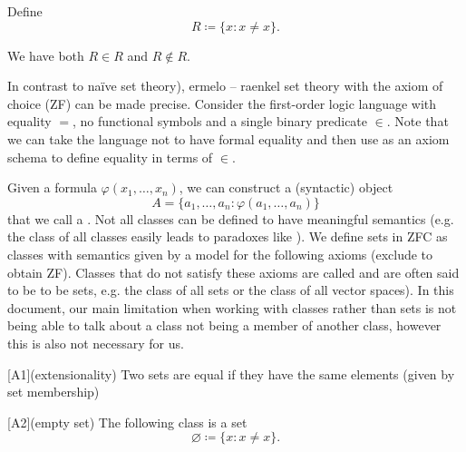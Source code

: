 \begin{example}\label{ex:russels_paradox_sets}
  Define
  \begin{equation*}
    R \coloneqq \{ x \colon x \neq x \}.
  \end{equation*}

  We have both \( R \in R \) and \( R \not\in R \).
\end{example}

\begin{definition}\label{def:set_zfc}\cite[271]{Enderton1977}
  In contrast to na\"ive set theory), ermelo – raenkel set theory with the axiom of choice (ZF) can be made precise. Consider the first-order logic language with equality \( = \), no functional symbols and a single binary predicate \( \in \). Note that we can take the language not to have formal equality and then use  as an axiom schema to define equality in terms of \( \in \).

  Given a formula \( \varphi(x_1, \ldots, x_n) \), we can construct a (syntactic) object
  \begin{equation*}
    A = \{ a_1, \ldots, a_n \colon \varphi(a_1, \ldots, a_n) \}
  \end{equation*}
  that we call a . Not all classes can be defined to have meaningful semantics (e.g. the class of all classes easily leads to paradoxes like ). We define sets in ZFC as classes with semantics given by a model for the following axioms (exclude  to obtain ZF). Classes that do not satisfy these axioms are called  and are often said to be  to be sets, e.g. the class of all sets or the class of all vector spaces). In this document, our main limitation when working with classes rather than sets is not being able to talk about a class not being a member of another class, however this is also not necessary for us.

  \begin{description}
    [A1](extensionality) Two sets are equal if they have the same elements (given by set membership)

    [A2](empty set) The following class is a set
    \begin{equation*}
      \varnothing \coloneqq \{ x \colon x \neq x \}.
    \end{equation*}


\end{description}
\end{definition}
